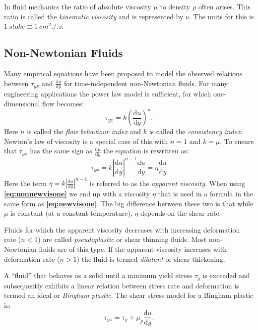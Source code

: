 In fluid mechanics the ratio of absolute viscosity $\mu$ to density $\rho$ often arises. This ratio is called the \textit{kinematic viscosity} and is represented by $\nu$. The units for this is $\qty{1}{stoke} \equiv \qty{1}{cm^2.\per.s}$.

\subsection{Non-Newtonian Fluids}
Many empirical equations have been proposed to model the observed relations between $\tau_{yx}$ and $\frac{\mathrm{d}u}{\mathrm{d}y} $ for time-independent non-Newtonian fluids. For many engineering applications the power law model is sufficient, for which one-dimensional flow becomes:
\[ 
\tau_{yx} = k \left( \frac{\mathrm{d}u}{\mathrm{d}y}  \right)^{n}
.\]
Here $n$ is called the \textit{flow behaviour index} and $k$ is called the \textit{consistency index}. Newton's law of viscosity is a special case of this with $n = 1$ and $k = \mu$. To ensure that $\tau_{yx}$ has the same sign as $\frac{\mathrm{d}u}{\mathrm{d}y} $ the equation is rewritten as:
\begin{equation} \label{eq:nonnewvisone}
  \tau_{yx} = k \left| \frac{\mathrm{d}u}{\mathrm{d}y}  \right|^{n-1} \frac{\mathrm{d}u}{\mathrm{d}y} = \eta \frac{\mathrm{d}u}{\mathrm{d}y} 
\end{equation}
Here the term $\eta = k \left| \frac{\mathrm{d}u}{\mathrm{d}y}  \right|^{n-1}$ is referred to as the \textit{apparent viscosity}. When using \textbf{\autoref{eq:nonnewvisone}} we end up with a viscosity $\eta$ that is used in a formula in the same form as \textbf{\autoref{eq:newvisone}}. The big difference between these two is that while $\mu$ is constant (at a constant temperature), $\eta$ depends on the shear rate.

Fluids for which the apparent viscosity decreases with increasing deformation rate ($n<1$) are called \textit{pseudoplastic} or shear thinning fluids. Most non-Newtonian fluids are of this type. If the apparent viscosity increases with deformation rate ($n>1$) the fluid is termed \textit{dilatant} or shear thickening.

A ``fluid'' that behaves as a solid until a minimum yield stress $\tau_y$ is exceeded and subsequently exhibits a linear relation between stress rate and deformation is termed an ideal or \textit{Bingham plastic}. The shear stress model for a Bingham plastic is:
\[ 
\tau_{yx} = \tau_y + \mu_p \frac{\mathrm{d}u}{\mathrm{d}y} 
.\]

